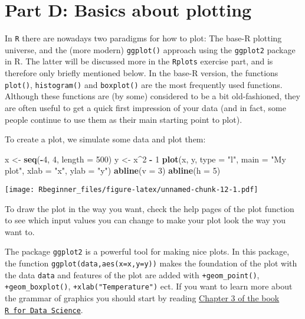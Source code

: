 \documentclass[]{article}
\newenvironment{Shaded}{\begin{snugshade}}{\end{snugshade}}
\newcommand{\KeywordTok}[1]{\textcolor[rgb]{0.13,0.29,0.53}{\textbf{#1}}}
\newcommand{\DataTypeTok}[1]{\textcolor[rgb]{0.13,0.29,0.53}{#1}}
\newcommand{\DecValTok}[1]{\textcolor[rgb]{0.00,0.00,0.81}{#1}}
\newcommand{\StringTok}[1]{\textcolor[rgb]{0.31,0.60,0.02}{#1}}
\newcommand{\OperatorTok}[1]{\textcolor[rgb]{0.81,0.36,0.00}{\textbf{#1}}}
\newcommand{\NormalTok}[1]{#1}
\begin{document}
\section{Part D: Basics about
plotting}\label{part-d-basics-about-plotting}

In \texttt{R} there are nowadays two paradigms for how to plot: The
base-R plotting universe, and the (more modern) \texttt{ggplot()}
approach using the \texttt{ggplot2} package in R. The latter will be
discussed more in the \texttt{Rplots} exercise part, and is therefore
only briefly mentioned below. In the base-R version, the functions
\texttt{plot()}, \texttt{histogram()} and \texttt{boxplot()} are the
most frequently used functions. Although these functions are (by some)
considered to be a bit old-fashioned, they are often useful to get a
quick first impression of your data (and in fact, some people continue
to use them as their main starting point to plot).

To create a plot, we simulate some data and plot them:

\begin{Shaded}
\begin{Highlighting}[]
\NormalTok{x <-}\StringTok{ }\KeywordTok{seq}\NormalTok{(}\OperatorTok{-}\DecValTok{4}\NormalTok{, }\DecValTok{4}\NormalTok{, }\DataTypeTok{length =} \DecValTok{500}\NormalTok{)}
\NormalTok{y <-}\StringTok{ }\NormalTok{x}\OperatorTok{^}\DecValTok{2} \OperatorTok{-}\StringTok{ }\DecValTok{1}
\KeywordTok{plot}\NormalTok{(x, y, }\DataTypeTok{type =} \StringTok{"l"}\NormalTok{, }\DataTypeTok{main =} \StringTok{"My plot"}\NormalTok{, }\DataTypeTok{xlab =} \StringTok{"x"}\NormalTok{, }\DataTypeTok{ylab =} \StringTok{"y"}\NormalTok{)}
\KeywordTok{abline}\NormalTok{(}\DataTypeTok{v =} \DecValTok{3}\NormalTok{)}
\KeywordTok{abline}\NormalTok{(}\DataTypeTok{h =} \DecValTok{5}\NormalTok{)}
\end{Highlighting}
\end{Shaded}

\texttt{[image: Rbeginner\_files/figure-latex/unnamed-chunk-12-1.pdf]}

To draw the plot in the way you want, check the help pages of the plot
function to see which input values you can change to make your plot look
the way you want to.

The package \texttt{ggplot2} is a powerful tool for making nice plots.
In this package, the function \texttt{ggplot(data,aes(x=x,y=y))} makes
the foundation of the plot with the data \texttt{data} and features of
the plot are added with \texttt{+geom\_point()},
\texttt{+geom\_boxplot()}, \texttt{+xlab("Temperature")} ect. If you
want to learn more about the grammar of graphics you should start by
reading \href{http://r4ds.had.co.nz/data-visualisation.html}{Chapter 3
of the book \texttt{R\ for\ Data\ Science}}.
\end{document}
